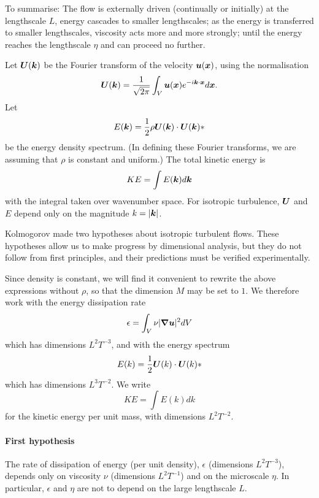 To summarise: The flow is externally driven (continually or initially) at the
lengthscale $L$, energy cascades to smaller lengthscales; as the energy is
transferred to smaller lengthscales, viscosity acts more and more strongly;
until the energy reaches the lengthscale $\eta$ and can proceed no further.

Let $\boldsymbol{U}(\boldsymbol{k})$ be the Fourier transform of the velocity $\boldsymbol{u}(\boldsymbol{x})$, 
using the normalisation
\begin{equation}
    \boldsymbol{U}(\boldsymbol{k}) = \frac{1}{\sqrt{2\pi}} \int_V \boldsymbol{u}(\boldsymbol{x}) e^{-i\boldsymbol{k}\cdot\boldsymbol{x}} d\boldsymbol{x}.
\end{equation}
Let 
\begin{equation}
    E(\boldsymbol{k}) = \frac{1}{2}\rho\boldsymbol{U}(\boldsymbol{k})\cdot\boldsymbol{U}(\boldsymbol{k})*
\end{equation}
be the energy density spectrum. (In defining these Fourier transforms, we are
assuming that $\rho$ is constant and uniform.) The total kinetic energy is
\begin{equation}
    KE = \int E(\boldsymbol{k}) d\boldsymbol{k}
\end{equation}
with the integral taken over wavenumber space. For isotropic turbulence,
$\boldsymbol{U}$ and $E$ depend only on the magnitude $k=|\boldsymbol{k}|$. 

Kolmogorov made two hypotheses about isotropic turbulent flows. These hypotheses
allow us to make progress by dimensional analysis, but they do not follow from
first principles, and their predictions must be verified experimentally.

Since density is constant, we will find it convenient to rewrite the
above expressions without $\rho$, so that the dimension $M$ may be set to $1$.
We therefore work with the energy dissipation rate 
\begin{equation}
    \epsilon = \int_V\nu|\boldsymbol{\nabla}\boldsymbol{u}|^2dV
\end{equation}
which has dimensions $L^2 T^{-3}$, and with the energy spectrum
\begin{equation}
    E(k) = \frac{1}{2}\boldsymbol{U}(k)\cdot\boldsymbol{U}(k)*
\end{equation}
which has dimensions $L^3 T^{-2}$. We write 
\begin{equation}
    KE = \int E(k) dk
\end{equation}
for the kinetic energy per unit mass, with dimensions $L^2 T^{-2}$.


\paragraph{First hypothesis} The rate of dissipation of energy (per unit
density), $\epsilon$ (dimensions $L^2T^{-3}$), depends only on viscosity $\nu$
(dimensions $L^2T^{-1}$) and on the microscale $\eta$. In particular, $\epsilon$ and
$\eta$ are not to depend on the large lengthscale $L$.


